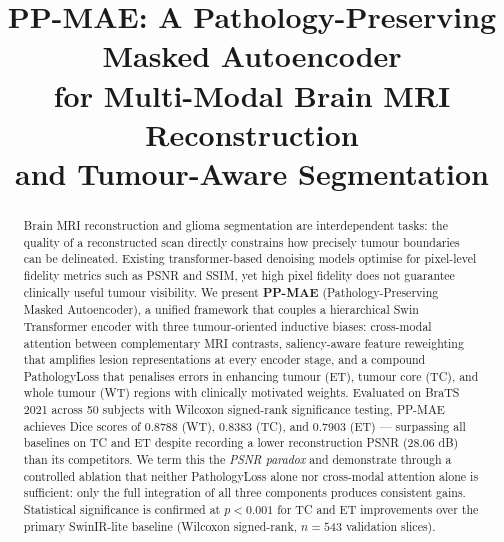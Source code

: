 \documentclass[conference]{IEEEtran}
\begin{document}
\title{PP-MAE: A Pathology-Preserving Masked Autoencoder\\
for Multi-Modal Brain MRI Reconstruction\\
and Tumour-Aware Segmentation}

\author{
}

\maketitle

\begin{abstract}
Brain MRI reconstruction and glioma segmentation are interdependent
tasks: the quality of a reconstructed scan directly constrains
how precisely tumour boundaries can be delineated. Existing
transformer-based denoising models optimise for pixel-level fidelity
metrics such as PSNR and SSIM, yet high pixel fidelity does not
guarantee clinically useful tumour visibility. We present
\textbf{PP-MAE} (Pathology-Preserving Masked Autoencoder), a
unified framework that couples a hierarchical Swin Transformer
encoder with three tumour-oriented inductive biases: cross-modal
attention between complementary MRI contrasts, saliency-aware
feature reweighting that amplifies lesion representations at every
encoder stage, and a compound PathologyLoss that penalises errors
in enhancing tumour (ET), tumour core (TC), and whole tumour (WT)
regions with clinically motivated weights. Evaluated on BraTS 2021
across 50 subjects with Wilcoxon signed-rank significance testing,
PP-MAE achieves Dice scores of 0.8788 (WT), 0.8383 (TC), and 0.7903
(ET) — surpassing all baselines on TC and ET despite recording a
lower reconstruction PSNR (28.06 dB) than its competitors. We term
this the \emph{PSNR paradox} and demonstrate through a controlled
ablation that neither PathologyLoss alone nor cross-modal attention
alone is sufficient: only the full integration of all three components
produces consistent gains. Statistical significance is confirmed at
$p < 0.001$ for TC and ET improvements over the primary SwinIR-lite
baseline (Wilcoxon signed-rank, $n = 543$ validation slices).
\end{abstract}
\end{document}
